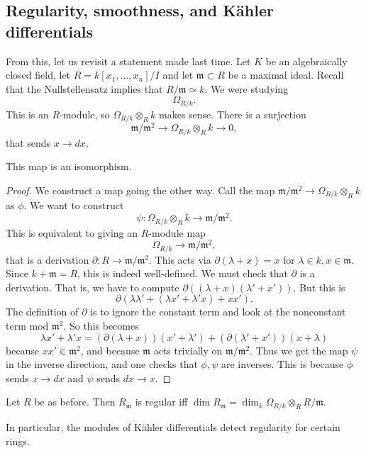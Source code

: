 \subsection{Regularity, smoothness, and K\"ahler differentials}
From this, let us revisit a statement made last time. 
Let $K$ be an algebraically closed field, let $R = k[x_1, \dots, x_n]/I$ and
let $\mathfrak{m} \subset R$ be a maximal ideal. Recall that the
Nullstellensatz implies that $R/\mathfrak{m} \simeq k$. We were studying 
\[ \Omega_{R/k}.  \]
This is an $R$-module, so $\Omega_{R/k} \otimes_R k$ makes sense. There is a
surjection
\[ \mathfrak{m}/\mathfrak{m}^2 \to \Omega_{R/k} \otimes_R k \to 0,  \]
that sends $x \to dx$.
\begin{proposition} 
This map is an isomorphism.
\end{proposition} 
\begin{proof} 
We construct a map going the other way. Call the map $\mathfrak{m}/\mathfrak{m}^2 \to
\Omega_{R/k} \otimes_R k$ as $\phi$. We want to construct
\[ \psi: \Omega_{R/k} \otimes_R k \to \mathfrak{m}/\mathfrak{m}^2.  \]
This is equivalent to giving an $R$-module map 
\[ \Omega_{R/k} \to \mathfrak{m}/\mathfrak{m}^2,  \]
that is a derivation $\partial: R \to \mathfrak{m}/\mathfrak{m}^2$. This acts
via $\partial(\lambda + x) = x$ for $\lambda \in k, x \in \mathfrak{m}$. Since
$k+\mathfrak{m} = R$, this is indeed well-defined. We must check that
$\partial$ is a derivation. That is, we have to compute
$\partial((\lambda+x)(\lambda' + x'))$.
But this is 
\[ \partial(\lambda\lambda' + (\lambda x' + \lambda' x) + xx').  \]
The definition of $\partial$ is to ignore the constant term and look at the
nonconstant term mod $\mathfrak{m}^2$. So this becomes
\[ \lambda x' + \lambda' x = (\partial (\lambda+x)) (x'+\lambda') + (\partial (\lambda'+
x')) (x+\lambda)  \]
because $xx' \in \mathfrak{m}^2$, and because $\mathfrak{m}$ acts trivially on
$\mathfrak{m}/\mathfrak{m}^2$. Thus we get the map $\psi$ in the inverse
direction, and one checks that $\phi, \psi$ are inverses. This is because
$\phi$ sends $x \to dx$ and $\psi$ sends $dx \to x$.
\end{proof} 

\begin{corollary} 
Let $R$ be as before. Then $R_{\mathfrak{m}}$ is regular iff $\dim
R_{\mathfrak{m}} = \dim_k \Omega_{R/k} \otimes_R R/\mathfrak{m}$.
\end{corollary} 
In particular, the modules of K\"ahler differentials detect regularity for
certain rings.

